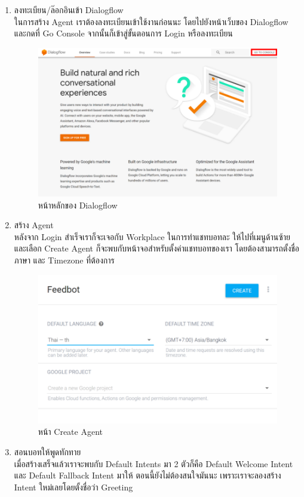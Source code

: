 \begin{enumerate}
	\item ลงทะเบียน/ล๊อกอินเข้า Dialogflow \\
	ในการสร้าง Agent เราต้องลงทะเบียนเข้าใช้งานก่อนนะ โดยไปยังหน้าเว็บของ Dialogflow และกดที่ Go Console จากนั้นก็เข้าสู่ขั้นตอนการ Login หรือลงทะเบียน

	\begin{figure}[H]
		\centering
		\includegraphics[width=0.7\columnwidth]{Figures/2/dialogflow_1}
		\caption{หน้าหลักของ Dialogflow}
		\label{Fig:f1}
	\end{figure}

	\item สร้าง Agent \\
	หลังจาก Login สำเร็จเราก็จะเจอกับ Workplace ในการทำแชทบอทละ ให้ไปที่เมนูด้านซ้าย และเลือก Create Agent ก็จะพบกับหน้าจอสำหรับตั้งค่าแชทบอทของเรา โดยต้องสามารถตั้งชื่อ ภาษา และ Timezone ที่ต้องการ

	\begin{figure}[H]
		\centering
		\includegraphics[width=0.7\columnwidth]{Figures/2/dialogflow_2}
		\caption{หน้า Create Agent}
		\label{Fig:f1}
	\end{figure}

	\item สอนบอทให้พูดทักทาย \\
	เมื่อสร้างเสร็จแล้วเราจะพบกับ Default Intents มา 2 ตัวก็คือ Default Welcome Intent และ Default Fallback Intent มาให้ ตอนนี้ยังไม่ต้องสนใจมันนะ เพราะเราจะลองสร้าง Intent ใหม่เลยโดยตั้งชื่อว่า Greeting


\end{enumerate}

